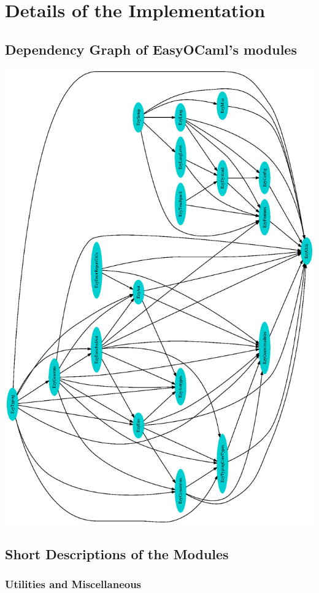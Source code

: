 
\section{Details of the Implementation}
\label{impldets}

\subsection{Dependency Graph of EasyOCaml's modules}

\includegraphics[width=\textwidth]{dot_deps}

\subsection{Short Descriptions of the Modules}

\subsubsection{Utilities and Miscellaneous}

